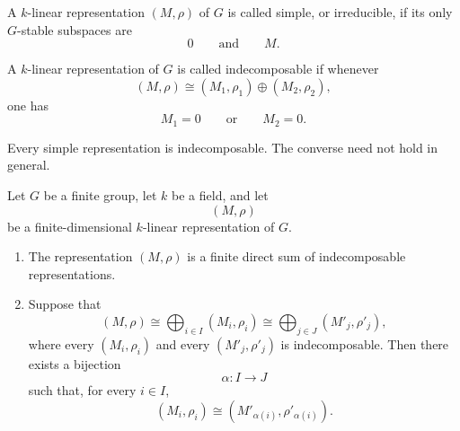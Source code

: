 \begin{definition}
    A \(k\)-linear representation \((M,\rho)\) of \(G\) is called simple, or
    irreducible, if its only \(G\)-stable subspaces are
    \[
        0
        \qquad\text{and}\qquad
        M.
    \]
\end{definition}

\begin{definition}
    A \(k\)-linear representation of \(G\) is called indecomposable if
    whenever
    \[
        (M,\rho)\cong
        (M_1,\rho_1)\oplus (M_2,\rho_2),
    \]
    one has
    \[
        M_1=0
        \qquad\text{or}\qquad
        M_2=0.
    \]
\end{definition}

\begin{remark}
    Every simple representation is indecomposable. The converse need not hold in
    general.
\end{remark}

\begin{theorem}
    Let \(G\) be a finite group, let \(k\) be a field, and let
    \[
        (M,\rho)
    \]
    be a finite-dimensional \(k\)-linear representation of \(G\).

    \begin{enumerate}
        \item The representation \((M,\rho)\) is a finite direct sum of
        indecomposable representations.

        \item Suppose that
        \[
            (M,\rho)
            \cong
            \bigoplus_{i\in I}(M_i,\rho_i)
            \cong
            \bigoplus_{j\in J}(M'_j,\rho'_j),
        \]
        where every \((M_i,\rho_i)\) and every \((M'_j,\rho'_j)\) is
        indecomposable. Then there exists a bijection
        \[
            \alpha:I\longrightarrow J
        \]
        such that, for every \(i\in I\),
        \[
            (M_i,\rho_i)\cong (M'_{\alpha(i)},\rho'_{\alpha(i)}).
        \]
    \end{enumerate}
\end{theorem}


